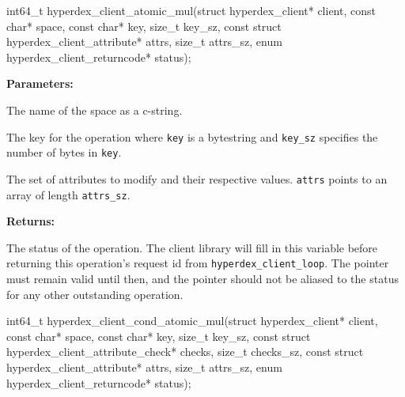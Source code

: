 \funcsep
{}
\begin{ccode}
int64_t hyperdex_client_atomic_mul(struct hyperdex_client* client,
                const char* space,
                const char* key, size_t key_sz,
                const struct hyperdex_client_attribute* attrs, size_t attrs_sz,
                enum hyperdex_client_returncode* status);
\end{ccode}
\funcdesc 

\noindent\textbf{Parameters:}
\begin{description}[labelindent=\widthof{{\texttt{attrs}, \texttt{attrs\_sz}}},leftmargin=*,noitemsep,nolistsep,align=right]
\item[\texttt{space}] The name of the space as a c-string.
\item[\texttt{key}, \texttt{key\_sz}] The key for the operation where \texttt{key} is a bytestring and \texttt{key\_sz} specifies the number of bytes in \texttt{key}.
\item[\texttt{attrs}, \texttt{attrs\_sz}] The set of attributes to modify and their respective values.  \texttt{attrs} points to an array of length \texttt{attrs\_sz}.
\end{description}

\noindent\textbf{Returns:}
\begin{description}[labelindent=\widthof{{\texttt{status}}},leftmargin=*,noitemsep,nolistsep,align=right]
\item[\texttt{status}] The status of the operation.  The client library will fill in this variable before returning this operation's request id from \texttt{hyperdex\_client\_loop}.  The pointer must remain valid until then, and the pointer should not be aliased to the status for any other outstanding operation.
\end{description}

\funcsep
{}
\begin{ccode}
int64_t hyperdex_client_cond_atomic_mul(struct hyperdex_client* client,
                const char* space,
                const char* key, size_t key_sz,
                const struct hyperdex_client_attribute_check* checks, size_t checks_sz,
                const struct hyperdex_client_attribute* attrs, size_t attrs_sz,
                enum hyperdex_client_returncode* status);
\end{ccode}
\funcdesc 

